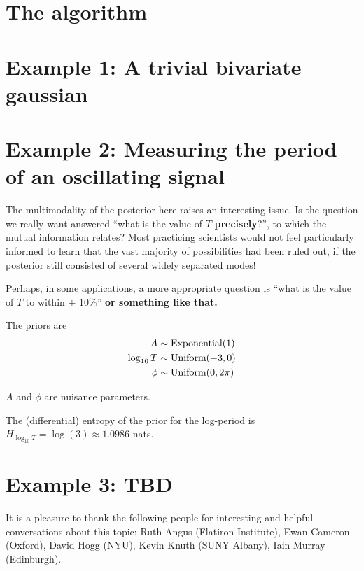 \documentclass[journal,article,accept,moreauthors,pdftex,12pt,a4paper]{mdpi}
\newcommand{\todo}{\color{orange} \bf}
\begin{document}
\section{The algorithm}


\section{Example 1: A trivial bivariate gaussian}


\section{Example 2: Measuring the period of an oscillating signal}


The multimodality of the posterior here raises an interesting issue. Is
the question we really want answered ``what is the value of $T$
{\bf precisely}?'', to which the mutual information relates?
Most practicing scientists would not feel particularly informed to learn
that the vast majority of possibilities had been ruled out, if the
posterior still consisted of several widely separated modes!

Perhaps, in some applications, a more appropriate question is
``what is the value of $T$ to within $\pm$ 10\%''
{\todo or something like that.}



The priors are
\begin{align}
A           &\sim \textnormal{Exponential}(1)  \\
\log_{10} T &\sim \textnormal{Uniform}(-3, 0)  \\
\phi        &\sim \textnormal{Uniform}(0, 2\pi)
\end{align}

$A$ and $\phi$ are nuisance parameters.

The (differential) entropy of the prior for the log-period is
$H_{\log_{10} T} = \log(3) \approx 1.0986$ nats.

\section{Example 3: TBD}

It is a pleasure to thank the following people for interesting and helpful
conversations about this topic: Ruth Angus (Flatiron Institute),
Ewan Cameron (Oxford), David Hogg (NYU), Kevin Knuth (SUNY Albany),
Iain Murray (Edinburgh).

\end{document}
